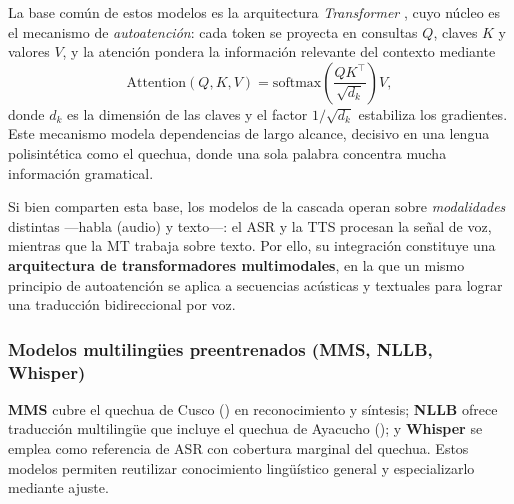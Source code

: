 \begin{bloqueNuevo}
\noindent La base com{\'u}n de estos modelos es la arquitectura \emph{Transformer}
\parencite{vaswani2017attention}, cuyo n{\'u}cleo es el mecanismo de \emph{autoatenci{\'o}n}: cada
token se proyecta en consultas $Q$, claves $K$ y valores $V$, y la atenci{\'o}n pondera la
informaci{\'o}n relevante del contexto mediante
\begin{equation}
\mathrm{Attention}(Q,K,V) = \mathrm{softmax}\!\left(\frac{QK^{\top}}{\sqrt{d_k}}\right)V,
\label{eq:atencion}
\end{equation}
donde $d_k$ es la dimensi{\'o}n de las claves y el factor $1/\sqrt{d_k}$ estabiliza los gradientes.
Este mecanismo modela dependencias de largo alcance, decisivo en una lengua polisint{\'e}tica como el
quechua, donde una sola palabra concentra mucha informaci{\'o}n gramatical.

\noindent Si bien comparten esta base, los modelos de la cascada operan sobre \emph{modalidades}
distintas ---habla (audio) y texto---: el ASR y la TTS procesan la se{\~n}al de voz, mientras que la
MT trabaja sobre texto. Por ello, su integraci{\'o}n constituye una \textbf{arquitectura de
transformadores multimodales}, en la que un mismo principio de autoatenci{\'o}n se aplica a
secuencias ac{\'u}sticas y textuales para lograr una traducci{\'o}n bidireccional por voz.
\end{bloqueNuevo}

\subsubsection{Modelos multiling{\"u}es preentrenados (MMS, NLLB, Whisper)}
\textbf{MMS} \parencite{pratap2024mms} cubre el quechua de Cusco () en reconocimiento y
s{\'i}ntesis; \textbf{NLLB} \parencite{costajussa2022nllb} ofrece traducci{\'o}n multiling{\"u}e que
incluye el quechua de Ayacucho (); y \textbf{Whisper} \parencite{radford2023whisper} se
emplea como referencia de ASR con cobertura marginal del quechua. Estos modelos permiten reutilizar
conocimiento ling{\"u}{\'i}stico general y especializarlo mediante ajuste.


